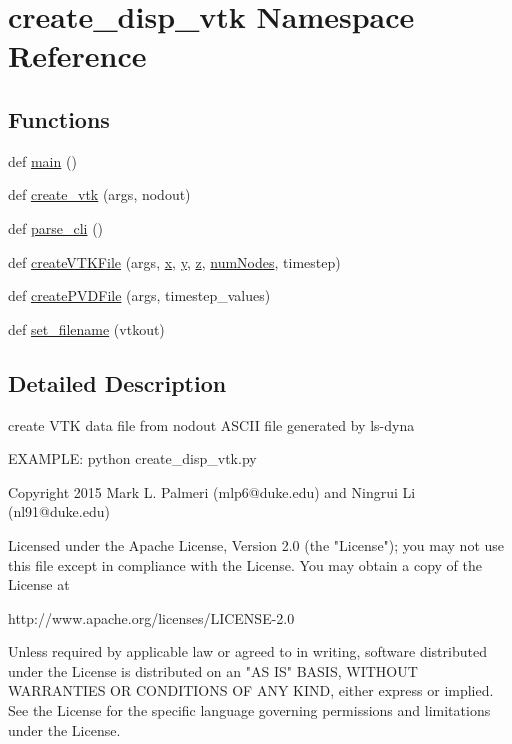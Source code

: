 \hypertarget{namespacecreate__disp__vtk}{}\section{create\+\_\+disp\+\_\+vtk Namespace Reference}
\label{namespacecreate__disp__vtk}
\subsection*{Functions}
\begin{DoxyCompactItemize}
\item 
def \hyperlink{namespacecreate__disp__vtk_a72429e670b45f61f53fc309ef87c836a}{main} ()
\item 
def \hyperlink{namespacecreate__disp__vtk_a8a2e85df552883779116617b84f31de9}{create\+\_\+vtk} (args, nodout)
\item 
def \hyperlink{namespacecreate__disp__vtk_aa29842250cfc59d230c0eb3617c0e900}{parse\+\_\+cli} ()
\item 
def \hyperlink{namespacecreate__disp__vtk_aea2510afb08b11659a0ee122da1d8a1e}{create\+V\+T\+K\+File} (args, \hyperlink{NodeElemVol_8m_a8c3012c133116401cdac1ce428bc768e}{x}, \hyperlink{NodeElemVol_8m_a5d941c5b5ef146d014201a3948b6c2a4}{y}, \hyperlink{extractAxisIntensity_8m_a34dfd9bff5c3c702017eca60ce544d67}{z}, \hyperlink{dynaField_8m_af9bd6d4d8ecd1b0563241fd648435e14}{num\+Nodes}, timestep)
\item 
def \hyperlink{namespacecreate__disp__vtk_acddcd5ee1cd483d966086fd3249f4a6c}{create\+P\+V\+D\+File} (args, timestep\+\_\+values)
\item 
def \hyperlink{namespacecreate__disp__vtk_ab932ee0e10a84dcbcd459ad50b12fe24}{set\+\_\+filename} (vtkout)
\end{DoxyCompactItemize}


\subsection{Detailed Description}
\begin{DoxyVerb}create VTK data file from nodout ASCII file generated by ls-dyna

EXAMPLE: python create_disp_vtk.py

Copyright 2015 Mark L. Palmeri (mlp6@duke.edu) and Ningrui Li (nl91@duke.edu)

Licensed under the Apache License, Version 2.0 (the "License");
you may not use this file except in compliance with the License.
You may obtain a copy of the License at

http://www.apache.org/licenses/LICENSE-2.0

Unless required by applicable law or agreed to in writing, software
distributed under the License is distributed on an "AS IS" BASIS,
WITHOUT WARRANTIES OR CONDITIONS OF ANY KIND, either express or implied.
See the License for the specific language governing permissions and
limitations under the License.
\end{DoxyVerb}
 

